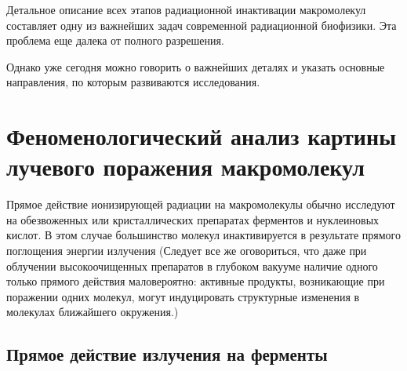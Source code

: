 \documentclass[a4paper, 14pt]{article}
\begin{document}
Детальное описание всех этапов радиационной инактивации макромолекул
составляет одну из важнейших задач современной радиационной биофизики. Эта
проблема еще далека от полного разрешения.

Однако уже сегодня можно говорить о важнейших деталях и указать основные
направления, по которым развиваются исследования.

\section{Феноменологический анализ картины лучевого поражения макромолекул}
Прямое действие ионизирующей радиации на макромолекулы обычно
исследуют на обезвоженных или кристаллических препаратах ферментов и
нуклеиновых кислот. 
В этом случае большинство молекул инактивируется в
результате прямого поглощения энергии излучения (Следует все же оговориться, что
даже при облучении высокоочищенных препаратов в глубоком вакууме наличие
одного только прямого действия маловероятно: активные продукты, возникающие при
поражении одних молекул, могут индуцировать структурные изменения в молекулах
ближайшего окружения.)

\subsection{Прямое действие излучения на ферменты}
\end{document}
